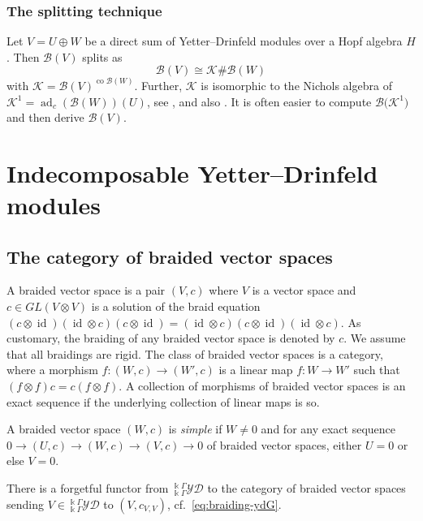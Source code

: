 \documentclass[10pt,a4paper]{amsart}
\numberwithin{equation}{section}
\newcommand{\adc}{\operatorname{ad}_c}
\newcommand{\co}{\operatorname{co}}
\newcommand{\id}{\operatorname{id}}
\newcommand{\toba}{\mathscr B}
\newcommand{\K}{{\mathcal{K}}}
\newcommand{\yd}[1]{{}_{#1}^{#1}\mathcal{YD}}
\begin{document}
\subsubsection{The splitting technique}\label{subsec:splitting-technique}

Let $V = U \oplus W$ be a direct sum of Yetter--Drinfeld modules over a Hopf algebra $H$.
Then $\toba(V)$ splits as
\begin{equation*} %
\toba(V) \cong \K \# \toba(W)
\end{equation*}
with $\K = \toba(V)^{\co \toba(W)}$.
Further, $\K$ is isomorphic to the Nichols algebra of $\K^1 =\adc (\toba(W))(U)$,
see \cite[Proposition~8.6]{HS-adv}, and also \cite[Lemma~3.2]{AHS}.
It is often easier to compute $\toba\big( \K^1\big)$ and then derive $\toba(V)$.

\section{Indecomposable Yetter--Drinfeld modules}%

\subsection{The category of braided vector spaces}\label{subsec:category-bvs}
A braided vector space is a pair $(V,c)$ where $V$ is a vector space and $c \in GL(V \otimes V)$ is a solution of the braid equation
$(c\otimes \id) (\id \otimes c)(c\otimes \id) = (\id \otimes c)(c\otimes \id)(\id \otimes c)$.
As customary, the braiding of any braided vector space is denoted by $c$.
We assume that all braidings are rigid.
The class of braided vector spaces is a category, where a morphism $f\colon (W, c) \to (W', c)$
is a linear map $f\colon W \to W'$ such that $(f \otimes f)c = c(f \otimes f)$.
A collection of morphisms of braided vector spaces is an exact sequence if the underlying collection of
linear maps is so.

\begin{Definition}
A braided vector space $(W, c)$ is \emph{simple} if $W \neq 0$
and for any exact sequence
$0 \to (U,c) \to (W, c) \to (V,c) \to 0$ of braided vector spaces, either $U=0$ or else $V=0$.
\end{Definition}

There is a forgetful functor from $\yd{\Bbbk\Gamma}$ to the category of braided vector spaces sending
$V \in \yd{\Bbbk\Gamma}$ to $(V, c_{V,V})$, cf.~\eqref{eq:braiding-ydG}.
\end{document}
